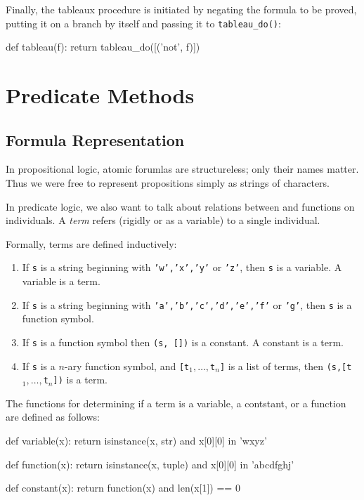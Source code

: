 \documentclass[a4paper,notitlepage]{scrartcl}
\begin{document}
Finally, the tableaux procedure is initiated by negating the formula to be
proved, putting it on a branch by itself and passing it to
\texttt{tableau\_do()}:

\begin{code}
def tableau(f):
    return tableau_do([('not', f)])
\end{code}

\section{Predicate Methods}

\subsection{Formula Representation}
In propositional logic, atomic forumlas are structureless; only their
   names matter.
Thus we were free to represent propositions simply as strings of characters.

In predicate logic, we also want to talk about relations between and functions
   on individuals. 
A \emph{term} refers (rigidly or as a variable) to a single individual.

Formally, terms are defined inductively:
\begin{enumerate}
\item If \texttt{s} is a string beginning with \texttt{'w','x','y'} or 
   \texttt{'z'}, then \texttt{s} is a variable.
A variable is a term.
\item If \texttt{s} is a string beginning with \texttt{'a','b','c','d','e','f'} 
   or \texttt{'g'}, then \texttt{s} is a function symbol.
\item If \texttt{s} is a function symbol then \texttt{(s, [])} is a constant.
A constant is a term.
\item  
If \texttt{s} is a $n$-ary function symbol, and \texttt{[t$_1,\ldots,$t$_n$]} 
   is a list of terms, then \texttt{(s,[t$_1,\ldots,$t$_n$])} is a term.
\end{enumerate}

The functions for determining if a term is a variable, a contstant, or a
   function are defined as follows:
\begin{code}
def variable(x):
    return isinstance(x, str) and x[0][0] in 'wxyz'

def function(x):
    return isinstance(x, tuple) and x[0][0] in 'abcdfghj'

def constant(x):
    return function(x) and len(x[1]) == 0 
\end{code}
\end{document}
